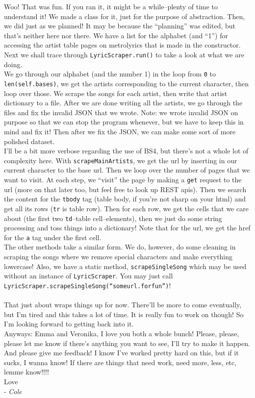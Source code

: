 \documentclass[12pt]{article}
\begin{document}
Woo! That was fun. If you ran it, it might be a while--plenty of time to understand it! We made a class for it, just for the purpose of abstraction. Then, we did just as we planned! It may be because the ``planning'' was edited, but that's neither here nor there. We have a list for the alphabet (and ``1'') for accessing the artist table pages on metrolyrics that is made in the constructor. Next we shall trace through \texttt{LyricScraper.run()} to take a look at what we are doing.\\
We go through our alphabet (and the number 1) in the loop from \texttt{0} to \texttt{len(self.bases)}, we get the artists corresponding to the current character, then loop over those. We scrape the songs for each artist, then write that artist dictionary to a file. After we are done writing all the artists, we go through the files and fix the invalid JSON that we wrote. Note: we wrote invalid JSON on purpose so that we can stop the program whenever, but we have to keep this in mind and fix it! Then after we fix the JSON, we can make some sort of more polished dataset.\\
I'll be a bit more verbose regarding the use of BS4, but there's not a whole lot of complexity here. With \texttt{scrapeMainArtists}, we get the url by inserting in our current character to the base url. Then we loop over the number of pages that we want to visit. At each step, we ``visit'' the page by making a \texttt{get} request to the url (more on that later too, but feel free to look up REST apis). Then we search the content for the \texttt{tbody} tag (table body, if you're not sharp on your html) and get all its rows (\texttt{tr} is table row). Then for each row, we get the cells that we care about (the first two \texttt{td}--table cell--elements), then we just do some string processing and toss things into a dictionary! Note that for the url, we get the href for the \texttt{a} tag under the first cell.\\
The other methods take a similar form. We do, however, do some cleaning in scraping the songs where we remove special characters and make everything lowercase! Also, we have a static method, \texttt{scrapeSingleSong} which may be used without an instance of \texttt{LyricScraper}. You may just call \texttt{LyricScraper.scrapeSingleSong(``someurl.forfun'')}!\\

\\

That just about wraps things up for now. There'll be more to come eventually, but I'm tired and this takes a lot of time. It is really fun to work on though! So I'm looking forward to getting back into it.\\
Anyways: Emma and Veronika, I love you both a whole bunch! Please, please, please let me know if there's anything you want to see, I'll try to make it happen. And please give me feedback! I know I've worked pretty hard on this, but if it sucks, I wanna know! If there are things that need work, need more, less, etc, lemme know!!!!\\
Love\\
- \textit{Cole}\\
\end{document}
